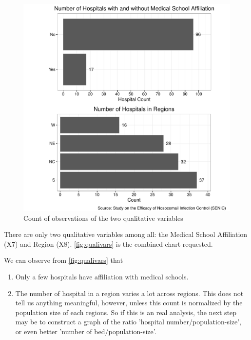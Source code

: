 \documentclass[11pt]{article}
\begin{document}
\begin{figure}[H]
  \centering
  \includegraphics[scale=0.8]{qualitative_vars.pdf}
  \caption{Count of observations of the two
    qualitative variables}
  \label{fig:qualivars}
\end{figure}

There are only two qualitative variables among all: the Medical School
Affiliation (X7) and Region (X8). \autoref{fig:qualivars} is the combined
chart requested.

We can observe from \autoref{fig:qualivars} that
\begin{enumerate}
\item
  Only a few hospitals have affiliation with medical schools.
\item
  The number of hospital in a region varies a lot across regions. This
  does not tell us anything meaningful, however, unless this count is
  normalized by the population size of each regions. So if this is an
  real analysis, the next step may be to construct a graph of the ratio
  'hospital number/population-size', or even better
  'number of bed/population-size'.
\end{enumerate}
\end{document}
